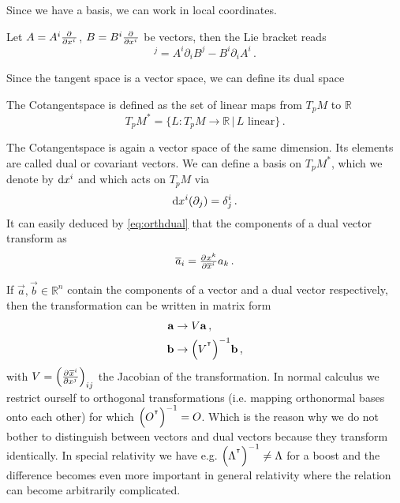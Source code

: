 Since we have a basis, we can work in local coordinates.
\begin{example}
Let $A=A^i\pd{}{{x^i}}$, $B=B^i\pd{}{{x^i}}$ be vectors, then the Lie bracket
reads
\begin{equation}
    [A,B]^j=A^i\partial_iB^j-B^i\partial_iA^i\, .
\end{equation}
\end{example}
Since the tangent space is a vector space, we can define its dual space
\begin{definition}[Cotangentspace] The Cotangentspace is defined as the set of
linear maps from $T_pM$ to $\mathbb{R}$
\begin{equation}
    T_pM^*=\{L:T_pM\to \mathbb{R}\, |\, L \text{ linear}\}\, .
\end{equation}
\end{definition}
The Cotangentspace is again a vector space of the same dimension. Its elements
are called dual or covariant vectors.
We can define a basis on $	T_pM^*$, which we denote by $\dif x^i$ and  which acts on $T_pM$ via
\begin{equation}
    \dif x^i(\partial_j)=\delta^i_j\, . \label{eq:orthdual}
\end{equation}
It can easily deduced by \eqref{eq:orthdual} that the components of a dual vector transform as
\begin{equation}
    \overline{a}_i=\pd{x^k}{{\overline{x}^i}}a_k\, .
\end{equation}
\begin{remark}
If $\vec{a},\vec{b}\in\mathbb{R}^n$ contain the components of a vector and a
dual vector respectively, then the transformation can be written in matrix form
\begin{align}
    \vec{a}&\to V\vec{a}\, ,\\
    \vec{b}&\to\left(V\transpose\right)^{-1}\vec{b}\, ,
\end{align}
with $V=\left(\pd{\overline{x}^i}{{x^j}}\right)_{ij}$ the
Jacobian of the transformation.
In normal calculus we restrict ourself to orthogonal transformations (i.e.
mapping orthonormal bases onto each other) for which
$\left(O\transpose\right)^{-1}=O$.
Which is the reason why we do not bother to distinguish between vectors and dual vectors because they transform identically. 
In special relativity we have e.g.
$\left(\Lambda\transpose\right)^{-1}\neq\Lambda$ for a boost and the difference
becomes even more important in general relativity where the relation can become arbitrarily complicated.
\end{remark}
